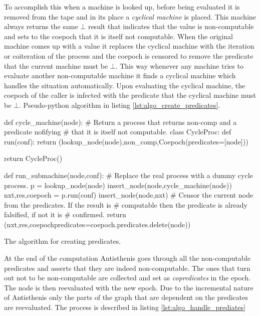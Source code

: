 To accomplish this when a machine is looked up, before being evaluated
it is removed from the tape and in its place a \emph{cyclical machine}
is placed. This machine always returns the same \(\bot\) result that
indicates that the value is non-computable and sets to the coepoch
that it is itself not computable. When the original machine comes up
with a value it replaces the cyclical machine with the iteration or
coiteration of the process and the coepoch is censored to remove the
predicate that the current machine must be \(\bot\). This way whenever
any machine tries to evaluate another non-computable machine it finds
a cyclical machine which handles the situation automatically. Upon
evaluating the cyclical machine, the coepoch of the caller is infected
with the predicate that the cyclical machine must be
\(\bot\). Pseudo-python algorithm in listing
\ref{lst:algo_create_predicates}.

\begin{code}
\begin{pycode}
def cycle_machine(node):
    # Return a process that returns non-comp and a predicate nofifying
    # that it is itself not computable.
    class CycleProc:
        def run(conf):
           return (lookup_node(node),non_comp,Coepoch(predicates=[node]))

    return CycleProc()

def run_submachine(node,conf):
    # Replace the real process with a dummy cycle process.
    p = lookup_node(node)
    insert_node(node,cycle_machine(node))
    nxt,res,coepoch = p.run(conf)
    insert_node(node,nxt)
    # Censor the current node from the predicates. If the result is
    # computable then the predicate is already falsified, if not it is
    # confirmed.
    return (nxt,res,coepoch{predicates=coepoch.predicates.delete(node)})
\end{pycode}
  \caption{\label{lst:algo_create_predicates}The algorithm for
    creating predicates.}
\end{code}

At the end of the computation Antisthenis goes through all the
non-computable predicates and asserts that they are indeed
non-computable. The ones that turn out not to be non-computable are
collected and set as \emph{copredicates} in the epoch. The node is
then reevaluated with the new epoch. Due to the incremental nature of
Antisthenis only the parts of the graph that are dependent on the
predicates are reevaluated. The process is described in listing
\ref{lst:algo_handle_prediates}

